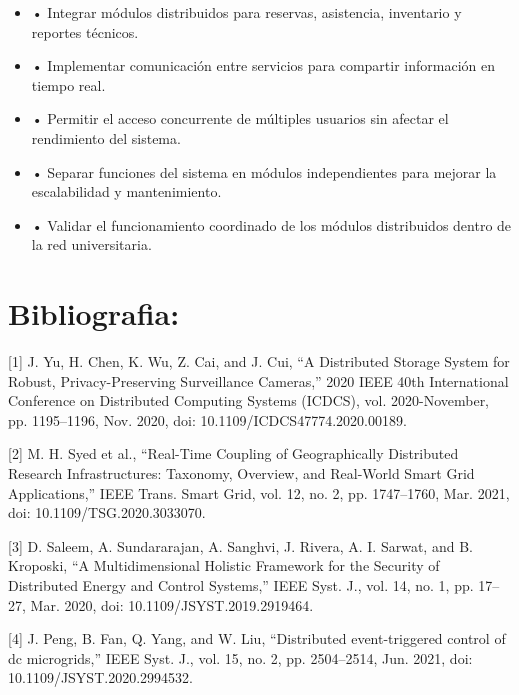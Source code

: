 \documentclass[12pt,a4paper]{article}
\begin{document}
\begin{itemize}

\item •	Integrar módulos distribuidos para reservas, asistencia, inventario y reportes técnicos.

\item •	Implementar comunicación entre servicios para compartir información en tiempo real.

\item •	Permitir el acceso concurrente de múltiples usuarios sin afectar el rendimiento del sistema.

\item •	Separar funciones del sistema en módulos independientes para mejorar la escalabilidad y mantenimiento.

\item •	Validar el funcionamiento coordinado de los módulos distribuidos dentro de la red universitaria.

\end{itemize}



\printbibliography
\section{Bibliografia:}
[1]	J. Yu, H. Chen, K. Wu, Z. Cai, and J. Cui, “A Distributed Storage System for Robust, Privacy-Preserving Surveillance Cameras,” 2020 IEEE 40th International Conference on Distributed Computing Systems (ICDCS), vol. 2020-November, pp. 1195–1196, Nov. 2020, doi: 10.1109/ICDCS47774.2020.00189.

\vspace{0.2cm}

[2]	M. H. Syed et al., “Real-Time Coupling of Geographically Distributed Research Infrastructures: Taxonomy, Overview, and Real-World Smart Grid Applications,” IEEE Trans. Smart Grid, vol. 12, no. 2, pp. 1747–1760, Mar. 2021, doi: 10.1109/TSG.2020.3033070.

\vspace{0.2cm}

[3]	D. Saleem, A. Sundararajan, A. Sanghvi, J. Rivera, A. I. Sarwat, and B. Kroposki, “A Multidimensional Holistic Framework for the Security of Distributed Energy and Control Systems,” IEEE Syst. J., vol. 14, no. 1, pp. 17–27, Mar. 2020, doi: 10.1109/JSYST.2019.2919464.

\vspace{0.2cm}

[4]	J. Peng, B. Fan, Q. Yang, and W. Liu, “Distributed event-triggered control of dc microgrids,” IEEE Syst. J., vol. 15, no. 2, pp. 2504–2514, Jun. 2021, doi: 10.1109/JSYST.2020.2994532.
\end{document}
